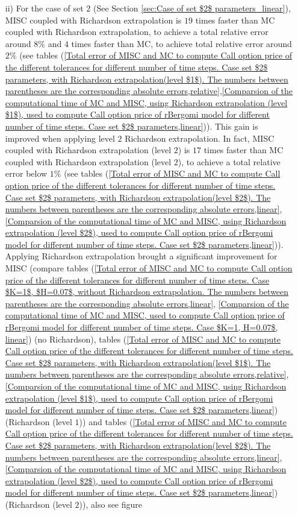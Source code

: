 \begin{enumerate}
			\item [ii)] For the case of set $2$ (See Section \ref{sec:Case of set $2$ parameters_linear}), MISC coupled with Richardson extrapolation is $19$ times faster than MC coupled with Richardson extrapolation, to achieve a total relative error around $8\%$ and $4$ times faster than MC, to achieve total relative error around $2\%$ (see tables (\ref{Total  error of MISC and MC to compute Call option price of the different tolerances for different number of time steps. Case set $2$ parameters, with Richardson extrapolation(level $1$). The numbers between parentheses are the corresponding absolute errors,relative},\ref{Comparsion of the computational time of  MC and MISC, using Richardson extrapolation (level $1$), used to compute Call option price of rBergomi model for different number of time steps. Case set $2$ parameters,linear})). This gain is improved when applying level $2$ Richardson extrapolation. In fact,  MISC coupled with Richardson extrapolation (level $2$) is $17$ times faster than MC coupled with Richardson extrapolation (level $2$), to achieve a total relative error below  $1\%$ (see  tables (\ref{Total  error of MISC and MC to compute Call option price of the different tolerances for different number of time steps. Case set $2$ parameters, with Richardson extrapolation(level $2$). The numbers between parentheses are the corresponding absolute errors,linear}, \ref{Comparsion of the computational time of  MC and MISC, using Richardson extrapolation (level $2$), used to compute Call option price of rBergomi model for different number of time steps. Case set $2$ parameters,linear})). Applying Richardson extrapolation brought a significant improvement for MISC (compare tables (\ref{Total error of MISC and MC to compute Call option price of the different tolerances for different number of time steps. Case $K=1$, $H=0.07$, without Richardson extrapolation. The numbers between parentheses are the corresponding absolute errors,linear}, \ref{Comparsion of the computational time of  MC and MISC, used to compute Call option price of rBergomi model for different number of time steps. Case $K=1, H=0.07$, linear}) (no Richardson), tables (\ref{Total  error of MISC and MC to compute Call option price of the different tolerances for different number of time steps. Case set $2$ parameters, with Richardson extrapolation(level $1$). The numbers between parentheses are the corresponding absolute errors,relative},\ref{Comparsion of the computational time of  MC and MISC, using Richardson extrapolation (level $1$), used to compute Call option price of rBergomi model for different number of time steps. Case set $2$ parameters,linear}) (Richardson (level $1$)) and  tables  (\ref{Total  error of MISC and MC to compute Call option price of the different tolerances for different number of time steps. Case set $2$ parameters, with Richardson extrapolation(level $2$). The numbers between parentheses are the corresponding absolute errors,linear}, \ref{Comparsion of the computational time of  MC and MISC, using Richardson extrapolation (level $2$), used to compute Call option price of rBergomi model for different number of time steps. Case set $2$ parameters,linear}) (Richardson (level $2$)), also see  figure 
\end{enumerate}
